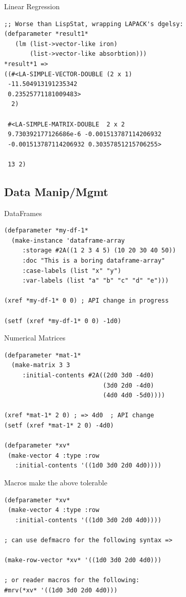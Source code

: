 \documentclass{beamer}
\begin{document}
\begin{frame}[fragile]{Linear Regression}
\small{
\begin{verbatim}
;; Worse than LispStat, wrapping LAPACK's dgelsy:
(defparameter *result1*
   (lm (list->vector-like iron)
       (list->vector-like absorbtion)))
*result*1 =>
((#<LA-SIMPLE-VECTOR-DOUBLE (2 x 1)
 -11.504913191235342
 0.23525771181009483>
  2)

 #<LA-SIMPLE-MATRIX-DOUBLE  2 x 2
 9.730392177126686e-6 -0.001513787114206932
 -0.001513787114206932 0.30357851215706255>   

 13 2)
\end{verbatim}
}
\end{frame}

\subsection{Data Manip/Mgmt}
\label{sec:work:data}

\begin{frame}[fragile]{DataFrames}
\small{
\begin{verbatim}
(defparameter *my-df-1*
  (make-instance 'dataframe-array
	 :storage #2A((1 2 3 4 5) (10 20 30 40 50))
	 :doc "This is a boring dataframe-array"
	 :case-labels (list "x" "y")
	 :var-labels (list "a" "b" "c" "d" "e")))

(xref *my-df-1* 0 0) ; API change in progress

(setf (xref *my-df-1* 0 0) -1d0)
\end{verbatim}
}
\end{frame}

\begin{frame}[fragile]{Numerical Matrices}
\small{
\begin{verbatim}
(defparameter *mat-1*
  (make-matrix 3 3
     :initial-contents #2A((2d0 3d0 -4d0)
                           (3d0 2d0 -4d0)
                           (4d0 4d0 -5d0))))

(xref *mat-1* 2 0) ; => 4d0  ; API change
(setf (xref *mat-1* 2 0) -4d0) 

(defparameter *xv*
 (make-vector 4 :type :row 
   :initial-contents '((1d0 3d0 2d0 4d0))))
\end{verbatim}
}
\end{frame}

\begin{frame}[fragile]{Macros make the above tolerable}
\begin{verbatim}
(defparameter *xv*
 (make-vector 4 :type :row 
   :initial-contents '((1d0 3d0 2d0 4d0))))

; can use defmacro for the following syntax =>

(make-row-vector *xv* '((1d0 3d0 2d0 4d0)))

; or reader macros for the following:
#mrv(*xv* '((1d0 3d0 2d0 4d0)))
\end{verbatim}
\end{frame}
\end{document}
